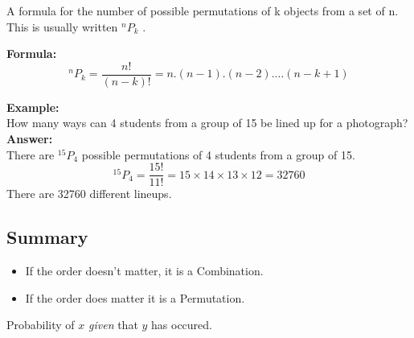 \documentclass[]{report}
\begin{document}
	A formula for the number of possible permutations of k objects from a set of n. This is usually written $^nP_k$ .
	
	
	\noindent\textbf{Formula:}	
	\[ ^nP_k = \frac{n!}{(n-k)!} =  n.(n-1).(n-2).\ldots(n-k+1) \]
	
	
	
	\noindent \textbf{Example:}\\	
	How many ways can 4 students from a group of 15 be lined up for a photograph?\\
	
	\noindent \textbf{Answer:	}\\
	There are $^{15}P_4$ possible permutations of 4 students from a group of 15.
	\[ ^{15}P_4 = \frac{15!}{11!} = 15\times 14\times 13\times 12 = 32760 \]
	There are 32760 different lineups.
	
	
	
	
	
	
	
	
	\subsection*{Summary}
	\begin{itemize}
		\item If the order doesn't matter, it is a Combination.
		\item If the order does matter it is a Permutation.
	\end{itemize}
	
	
	
	
	
	
	
	Probability of $x$ \emph{given} that $y$ has occured.
	
	
\end{document}
